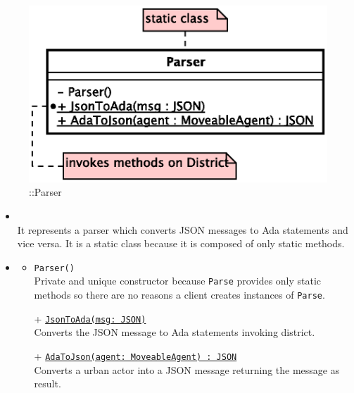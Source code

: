 \begin{figure}[h]
\centering
\includegraphics[scale=0.6,keepaspectratio]{images/solution/app/backend/parser.eps}
\caption{\pInterface::Parser}
\label{fig:sd-app-parser}
\end{figure}
\FloatBarrier
\begin{itemize}
  \item \textbf{\descr} \\
    It represents a parser which converts JSON messages to Ada statements and vice versa.
    It is a static class because it is composed of only static methods.
  \item \textbf{\ops}
  \begin{itemize}
   \item \texttt{Parser()} \\
   Private and unique constructor because \texttt{Parse} provides only static methods 
   so there are no reasons a client creates instances of \texttt{Parse}.
    \item[+] \texttt{\underline{JsonToAda(msg: JSON)}} \\
    Converts the JSON message to Ada statements invoking district.
    \item[+] \texttt{\underline{AdaToJson(agent: MoveableAgent) : JSON}} \\
    Converts a urban actor into a JSON message returning the message as result.
  \end{itemize}
\end{itemize}
